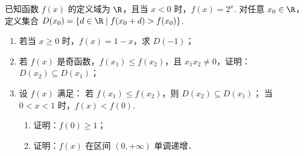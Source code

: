 \documentclass[UTF8,a4paper,oneside,11pt]{ctexbook}
\begin{document}
\begin{problem}
已知函数 \(f(x)\) 的定义域为 \(\R\)，且当 \(x<0\) 时，\(f(x)=2^x\). 对任意 \(x_0\in\R\)，定义集合 \(D(x_0)=\{d\in\R \mid f(x_0+d)>f(x_0)\}\).

\begin{enumerate}
\item 若当 \(x\ge 0\) 时，\(f(x)=1-x\)，求 \(D(-1)\)；
\item 若 \(f(x)\) 是奇函数，\(f(x_1)\le f(x_2)\)，且 \(x_1x_2\ne 0\)，证明：\(D(x_2)\subseteq D(x_1)\)；
\item 设 \(f(x)\) 满足： 若 \(f(x_1)\le f(x_2)\)，则 \(D(x_2)\subseteq D(x_1)\)； 当 \(0<x<1\) 时，\(f(x)<f(0)\).
\begin{enumerate}
\item 证明：\(f(0)\ge 1\)；
\item 证明：\(f(x)\) 在区间 \((0,+\infty)\) 单调递增．
\end{enumerate}
\end{enumerate}
\end{problem}
\end{document}
